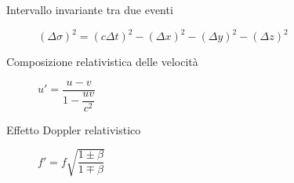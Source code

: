 \documentclass[a4paper,11pt,italian]{article}
\begin{document}
\begin{description}
%   
  \item[Intervallo invariante tra due eventi] 
  $ (\Delta \sigma)^2 = (c\Delta t)^2 - (\Delta x)^2 - (\Delta y)^2 - (\Delta z)^2 $
  
  
  \item[Composizione relativistica delle velocità]
  $ u' = \dfrac{u - v}{1- \dfrac{u v}{c^2}} $
  
  \item[Effetto Doppler relativistico] $ f' = f \sqrt{\dfrac{1 \pm \beta}{1 \mp \beta}} $
  

\end{description}
\end{document}
